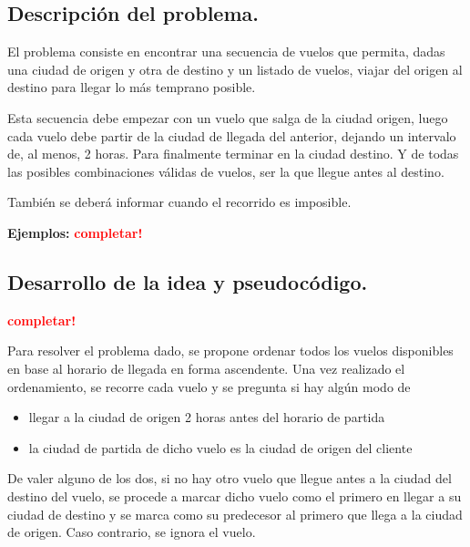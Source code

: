 \subsection{Descripción del problema.}

\vspace*{0.3cm}

El problema consiste en encontrar una secuencia de vuelos que permita, dadas una
ciudad de origen y otra de destino y un listado de vuelos, viajar del origen al destino
para llegar lo más temprano posible.

Esta secuencia debe empezar con un vuelo que salga de la ciudad origen, luego
cada vuelo debe partir de la ciudad de llegada del anterior, dejando un intervalo
de, al menos, 2 horas. Para finalmente terminar en la ciudad destino.
Y de todas las posibles combinaciones válidas de vuelos, ser la que llegue antes
al destino.

También se deberá informar cuando el recorrido es imposible.

\vspace*{0.5cm}

\textbf{Ejemplos:}
  \textcolor{red}{\textbf{completar!}}



\newpage
\subsection{Desarrollo de la idea y pseudocódigo.}

\vspace*{0.3cm}

\textcolor{red}{\textbf{completar!}}


Para resolver el problema dado, se propone ordenar todos los vuelos disponibles
en base al horario de llegada en forma ascendente. Una vez realizado el ordenamiento,
se recorre cada vuelo y se pregunta si hay algún modo de
\begin{itemize}
  \item llegar a la ciudad de origen 2 horas antes del horario de partida
  \item la ciudad de partida de dicho vuelo es la ciudad de origen del cliente
\end{itemize}
De valer alguno de los dos, si no hay otro vuelo que llegue antes a la ciudad del
destino del vuelo, se procede a marcar dicho vuelo como el primero en llegar a su
ciudad de destino y se marca como su predecesor al primero que llega a la ciudad
de origen. Caso contrario, se ignora el vuelo.

